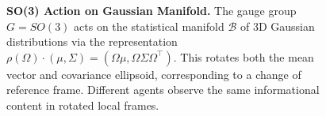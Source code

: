 \begin{figure}[h]
\caption{%
\textbf{SO(3) Action on Gaussian Manifold.} The gauge group $G = SO(3)$ acts on the statistical manifold $\mathcal{B}$ of 3D Gaussian distributions via the representation $\rho(\Omega) \cdot (\mu, \Sigma) = (\Omega\mu, \Omega\Sigma\Omega^{\top})$. This rotates both the mean vector and covariance ellipsoid, corresponding to a change of reference frame. Different agents observe the same informational content in rotated local frames.
}
\label{fig:so3_action}
\end{figure}

